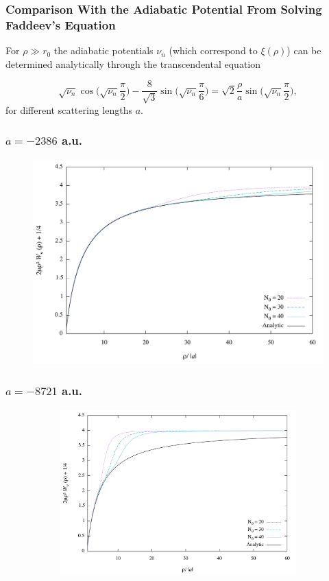 \documentclass{beamer}
\begin{document}
\begin{frame}
\frametitle{Comparison With the Adiabatic Potential From Solving Faddeev's Equation}
For $\rho \gg r_0$ the adiabatic potentials $\nu_n$ (which correspond to $ \xi(\rho)$) can be determined analytically through the transcendental equation

\begin{equation}\label{eq:transcendental}
\sqrt{\nu_n} \cos{\bigg(\sqrt{\nu_n} \frac{\pi}{2}\bigg)} - \frac{8}{\sqrt{3}}\sin{\bigg(\sqrt{\nu_n} \frac{\pi}{6}\bigg)} = \sqrt{2}\frac{\rho}{a}\sin{\bigg(\sqrt{\nu_n} \frac{\pi}{2}\bigg)}, 
\end{equation}
for different scattering lengths $a$.
\end{frame}

\begin{frame}
\frametitle{$a=-2386$ a.u.}
	\begin{figure}
		\includegraphics[width=0.8\linewidth]{convergence2.pdf}
	\end{figure}
\end{frame}

\begin{frame}
\frametitle{$a=-8721$ a.u.}
\begin{figure}
	\begin{figure}
		\includegraphics[width=0.8\linewidth]{convergence8.pdf}
	\end{figure}
\end{figure}
\end{frame}


\end{document}
